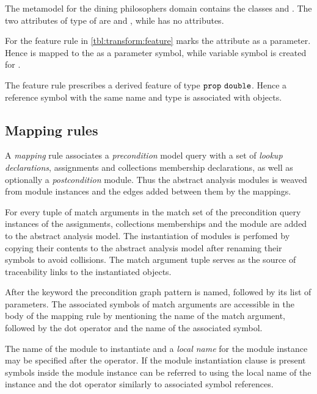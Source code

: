 \begin{runningExample}
  The metamodel for the dining philosophers domain contains the classes  and . The two attributes of type  of  are  and , while  has no attributes.

  For  the feature rule in \vref{tbl:transform:feature} marks the attribute  as a parameter. Hence  is mapped to the  as a parameter symbol, while  variable symbol is created for .

  The  feature rule prescribes a derived feature  of type \(\texttt{\upshape prop}\ \texttt{\upshape double}\). Hence a reference symbol with the same name and type is associated with  objects.
\end{runningExample}

\subsection{Mapping rules}

A \emph{mapping} rule associates a \emph{precondition} model query with a set of \emph{lookup declarations}, assignments and collections membership declarations, as well as optionally a \emph{postcondition}  module. Thus the abstract analysis modules is weaved from  module instances and the edges added between them by the mappings.

For every tuple of match arguments in the match set of the precondition query instances of the assignments, collections memberships and the  module are added to the abstract analysis model. The instantiation of modules is perfomed by copying their contents to the abstract analysis model after renaming their symbols to avoid collisions. The match argument tuple serves as the source of traceability links to the instantiated objects.

After the keyword  the precondition graph pattern is named, followed by its list of parameters. The associated symbols of match arguments are accessible in the body of the mapping rule by mentioning the name of the match argument, followed by the dot operator and the name of the associated symbol.

The name of the  module to instantiate and a \emph{local name} for the module instance may be specified after the \lit{=>} operator. If the module instantiation clause is present symbols inside the module instance can be referred to using the local name of the instance and the dot operator similarly to associated symbol references.

